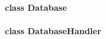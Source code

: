 \documentclass[paper=a4, fontsize=11pt,twoside]{article}
\begin{document}
\paragraph{class Database} %
\paragraph{class DatabaseHandler} %

\newpage


% 
% 
\end{document}
